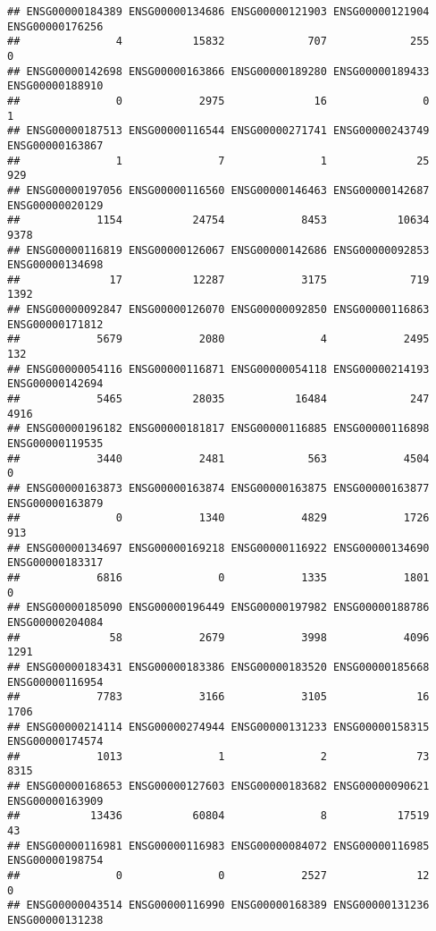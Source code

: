 \documentclass[
]{article}
\begin{document}
\begin{verbatim}
## ENSG00000184389 ENSG00000134686 ENSG00000121903 ENSG00000121904 ENSG00000176256 
##               4           15832             707             255               0 
## ENSG00000142698 ENSG00000163866 ENSG00000189280 ENSG00000189433 ENSG00000188910 
##               0            2975              16               0               1 
## ENSG00000187513 ENSG00000116544 ENSG00000271741 ENSG00000243749 ENSG00000163867 
##               1               7               1              25             929 
## ENSG00000197056 ENSG00000116560 ENSG00000146463 ENSG00000142687 ENSG00000020129 
##            1154           24754            8453           10634            9378 
## ENSG00000116819 ENSG00000126067 ENSG00000142686 ENSG00000092853 ENSG00000134698 
##              17           12287            3175             719            1392 
## ENSG00000092847 ENSG00000126070 ENSG00000092850 ENSG00000116863 ENSG00000171812 
##            5679            2080               4            2495             132 
## ENSG00000054116 ENSG00000116871 ENSG00000054118 ENSG00000214193 ENSG00000142694 
##            5465           28035           16484             247            4916 
## ENSG00000196182 ENSG00000181817 ENSG00000116885 ENSG00000116898 ENSG00000119535 
##            3440            2481             563            4504               0 
## ENSG00000163873 ENSG00000163874 ENSG00000163875 ENSG00000163877 ENSG00000163879 
##               0            1340            4829            1726             913 
## ENSG00000134697 ENSG00000169218 ENSG00000116922 ENSG00000134690 ENSG00000183317 
##            6816               0            1335            1801               0 
## ENSG00000185090 ENSG00000196449 ENSG00000197982 ENSG00000188786 ENSG00000204084 
##              58            2679            3998            4096            1291 
## ENSG00000183431 ENSG00000183386 ENSG00000183520 ENSG00000185668 ENSG00000116954 
##            7783            3166            3105              16            1706 
## ENSG00000214114 ENSG00000274944 ENSG00000131233 ENSG00000158315 ENSG00000174574 
##            1013               1               2              73            8315 
## ENSG00000168653 ENSG00000127603 ENSG00000183682 ENSG00000090621 ENSG00000163909 
##           13436           60804               8           17519              43 
## ENSG00000116981 ENSG00000116983 ENSG00000084072 ENSG00000116985 ENSG00000198754 
##               0               0            2527              12               0 
## ENSG00000043514 ENSG00000116990 ENSG00000168389 ENSG00000131236 ENSG00000131238 

\end{verbatim}
\end{document}
